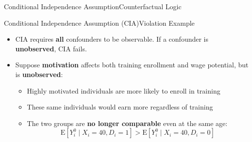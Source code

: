 \documentclass[dvipsnames,hyperref={pdfpagelabels=false}]{beamer}
\begin{document}
\begin{frame}{Conditional Independence Assumption}{Counterfactual Logic}

\end{frame}



\begin{frame}{Conditional Independence Assumption (CIA)}{Violation Example}
	\begin{itemize}
\item CIA requires \textbf{all} confounders to be observable. If a confounder is \textbf{unobserved}, CIA fails.
		\vspace{0.2cm}
	    \item Suppose \textbf{motivation} affects both training enrollment and wage potential, but is \textbf{unobserved}:

		\vspace{0.2cm}
		\begin{itemize}
			\item Highly motivated individuals are more likely to enroll in training 
			\vspace{0.2cm}
			\item These same individuals would earn more regardless of training
			\vspace{0.2cm}
	\item The two groups are \textbf{no longer comparable} even at the same age:
        \[
            \mathrm{E}[Y^{0}_{i}\mid X_i{=}40, D_i{=}1] > \mathrm{E}[Y^{0}_{i}\mid X_i{=}40, D_i{=}0]
        \]
		\end{itemize}
		
	\end{itemize}
\end{frame}
\end{document}

